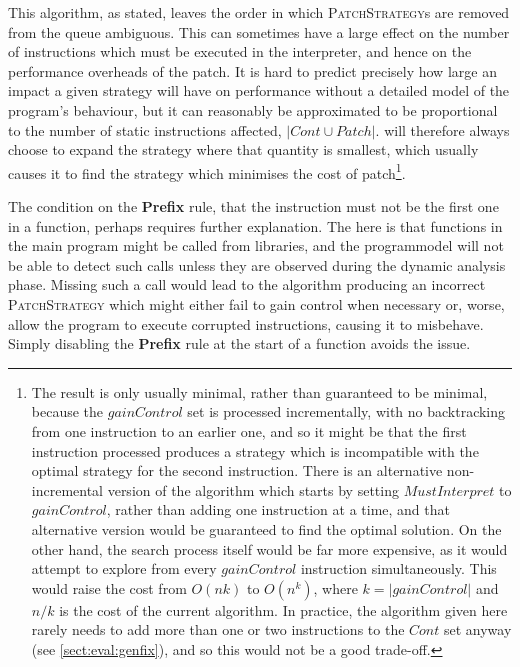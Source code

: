 This algorithm, as stated, leaves the order in which
\textsc{PatchStrategy}s are removed from the queue ambiguous.  This
can sometimes have a large effect on the number of instructions which
must be executed in the interpreter, and hence on the performance
overheads of the patch.  It is hard to predict precisely how large an
impact a given strategy will have on performance without a detailed
model of the program's behaviour, but it can reasonably be
approximated to be proportional to the number of static instructions
affected, $|\mathit{Cont} \cup \mathit{Patch}|$.  {\Implementation}
will therefore always choose to expand the strategy where that
quantity is smallest, which usually causes it to find the strategy
which minimises the cost of patch\footnote{The result is only usually
  minimal, rather than guaranteed to be minimal, because the
  $\mathit{gainControl}$ set is processed incrementally, with no
  backtracking from one instruction to an earlier one, and so it might
  be that the first instruction processed produces a strategy which is
  incompatible with the optimal strategy for the second instruction.
  There is an alternative non-incremental version of the algorithm
  which starts by setting $\mathit{MustInterpret}$ to
  $\mathit{gainControl}$, rather than adding one instruction at a
  time, and that alternative version would be guaranteed to find the
  optimal solution.  On the other hand, the search process itself
  would be far more expensive, as it would attempt to explore from
  every $\mathit{gainControl}$ instruction simultaneously.  This would
  raise the cost from $O(nk)$ to $O(n^k)$, where $k =
  |\mathit{gainControl}|$ and $n/k$ is the cost of the current
  algorithm.  In practice, the algorithm given here rarely needs to
  add more than one or two instructions to the $\mathit{Cont}$ set
  anyway (see \autoref{sect:eval:genfix}), and so this would not be a
  good trade-off.}.

The condition on the \textbf{Prefix} rule, that the instruction must
not be the first one in a function, perhaps requires further
explanation.  The here is that functions in the main program might be
called from libraries, and the \gls{programmodel} will not be able to
detect such calls unless they are observed during the dynamic analysis
phase.  Missing such a call would lead to the algorithm producing an
incorrect \textsc{PatchStrategy} which might either fail to gain
control when necessary or, worse, allow the program to execute
corrupted instructions, causing it to misbehave.  Simply disabling the
\textbf{Prefix} rule at the start of a function avoids the issue.

